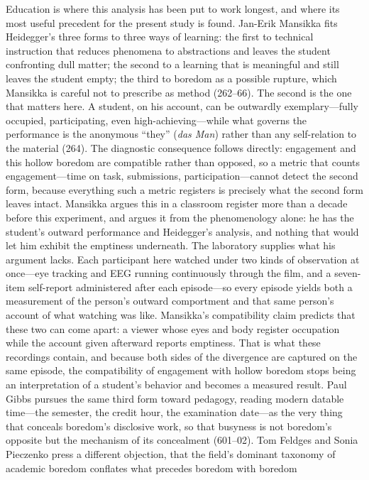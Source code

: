 Education is where this analysis has been put to work longest, and where its most useful
precedent for the present study is found. Jan-Erik Mansikka fits Heidegger's three forms to
three ways of learning: the first to technical instruction that reduces phenomena to
abstractions and leaves the student confronting dull matter; the second to a learning that is
meaningful and still leaves the student empty; the third to boredom as a possible rupture,
which Mansikka is careful not to prescribe as method (262--66). The second is the one that
matters here. A student, on his account, can be outwardly exemplary---fully occupied,
participating, even high-achieving---while what governs the performance is the anonymous
``they'' (\textit{das Man}) rather than any self-relation to the material (264). The
diagnostic consequence follows directly: engagement and this hollow boredom are compatible
rather than opposed, so a metric that counts engagement---time on task, submissions,
participation---cannot detect the second form, because everything such a metric registers is
precisely what the second form leaves intact. Mansikka argues this in a classroom register
more than a decade before this experiment, and argues it from the phenomenology alone: he has
the student's outward performance and Heidegger's analysis, and nothing that would let him
exhibit the emptiness underneath. The laboratory supplies what his argument lacks. Each
participant here watched under two kinds of observation at once---eye tracking and EEG running
continuously through the film, and a seven-item self-report administered after each
episode---so every episode yields both a measurement of the person's outward comportment and
that same person's account of what watching was like. Mansikka's compatibility claim predicts
that these two can come apart: a viewer whose eyes and body register occupation while the
account given afterward reports emptiness. That is what these recordings contain, and because
both sides of the divergence are captured on the same episode, the compatibility of engagement
with hollow boredom stops being an interpretation of a student's behavior and becomes a
measured result. Paul Gibbs pursues the same third form toward pedagogy, reading modern datable time---the
semester, the credit hour, the examination date---as the very thing that conceals boredom's
disclosive work, so that busyness is not boredom's opposite but the mechanism of its
concealment (601--02). Tom Feldges and Sonia Pieczenko press a different objection, that the
field's dominant taxonomy of academic boredom conflates what precedes boredom with boredom
